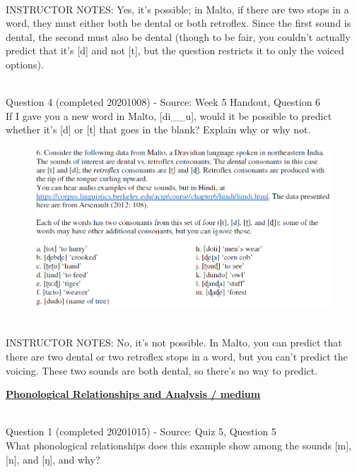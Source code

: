 \documentclass[12pt]{article}
\begin{document}
~\\
INSTRUCTOR NOTES: Yes, it's possible; in Malto, if there are two stops in a word, they must either both be dental or both retroflex. Since the first sound is dental, the second must also be dental (though to be fair, you couldn't actually predict that it's [d] and not [t], but the question restricts it to only the voiced options).


~\\

{\large Question 4} (completed 20201008) - Source: Week 5 Handout, Question 6\\

If I gave you a new word in Malto, [di\_\_u], would it be possible to predict whether it's [d] or [t] that goes in the blank? Explain why or why not.\\

\begin{figure}[H]
\includegraphics{../images/malto.png}
\end{figure}

~\\
INSTRUCTOR NOTES: No, it's not possible. In Malto, you can predict that there are two dental or two retroflex stops in a word, but you can't predict the voicing. These two sounds are both dental, so there's no way to predict.


\newpage\textbf{\underline{\huge Phonological Relationships and Analysis / medium\\}}

~\\

{\large Question 1} (completed 20201015) - Source: Quiz 5, Question 5\\

What phonological relationships does this example show among the sounds [m], [n], and [ŋ], and why?\\
\end{document}
